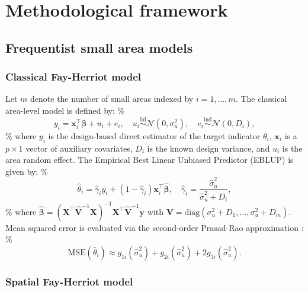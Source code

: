 \section{Methodological framework} \label{sec:methods}

\subsection{Frequentist small area models} \label{sec:methods_freq}

\subsubsection{Classical Fay-Herriot model}

Let \(m\) denote the number of small areas indexed by \(i = 1, \dots, m\). The classical area-level model \citep{fay1979estimates} is defined by:
\%
\begin{equation} \label{eq:fh_model}
y_i = \bm{x}_i^\top \bm{\beta} + u_i + e_i, \quad u_i \overset{\mathrm{iid}}{\sim} \mathcal{N}(0, \sigma_u^2), \quad e_i \overset{\mathrm{ind}}{\sim} \mathcal{N}(0, D_i),
\end{equation}
\%
where \(y_i\) is the design-based direct estimator of the target indicator \(\theta_i\), \(\bm{x}_i\) is a \(p \times 1\) vector of auxiliary covariates, \(D_i\) is the known design variance, and \(u_i\) is the area random effect. The Empirical Best Linear Unbiased Predictor (EBLUP) is given by:
\%
\begin{equation} \label{eq:fh_eblup}
\hat{\theta}_i = \hat{\gamma}_i y_i + (1 - \hat{\gamma}_i) \bm{x}_i^\top \hat{\bm{\beta}}, \quad \hat{\gamma}_i = \frac{\hat{\sigma}_u^2}{\hat{\sigma}_u^2 + D_i},
\end{equation}
\%
where \(\hat{\bm{\beta}} = (\bm{X}^\top \hat{\bm{V}}^{-1} \bm{X})^{-1} \bm{X}^\top \hat{\bm{V}}^{-1} \bm{y}\) with \(\bm{V} = \mathrm{diag}(\sigma_u^2 + D_1, \dots, \sigma_u^2 + D_m)\). Mean squared error is evaluated via the second-order Prasad-Rao approximation \citep{prasad1990estimation}:
\%
\begin{equation} \label{eq:fh_mse}
\mathrm{MSE}(\hat{\theta}_i) \approx g_{1i}(\hat{\sigma}_u^2) + g_{2i}(\hat{\sigma}_u^2) + 2 g_{3i}(\hat{\sigma}_u^2).
\end{equation}

\subsubsection{Spatial Fay-Herriot model}

